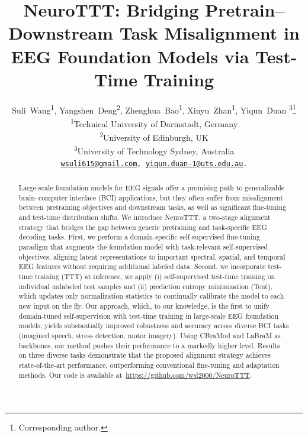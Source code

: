\documentclass{article} %
\title{NeuroTTT: Bridging Pretrain–Downstream Task Misalignment in EEG Foundation Models via Test-Time Training}
\author{Suli~Wang\textsuperscript{\rm 1}, 
Yangshen~Deng\textsuperscript{\rm 2}, 
Zhenghua~Bao\textsuperscript{\rm 1}, 
Xinyu~Zhan\textsuperscript{\rm 1}, 
Yiqun~Duan \textsuperscript{\rm 3}\thanks{Corresponding author.} \\
\textsuperscript{\rm 1}Technical University of Darmstadt, Germany\\
\textsuperscript{\rm 2}University of Edinburgh, UK\\
\textsuperscript{\rm 3}University of Technology Sydney, Australia\\
\texttt{\href{mailto:wsuli615@gmail.com}{wsuli615@gmail.com}, \href{mailto:yiqun.duan-1@uts.edu.au}{yiqun.duan-1@uts.edu.au}.} \\
}
\begin{document}
\maketitle

\begin{abstract}

Large-scale foundation models for EEG signals offer a promising path to generalizable brain–computer interface (BCI) applications, but they often suffer from misalignment between pretraining objectives and downstream tasks, as well as significant fine-tuning and test-time distribution shifts. We introduce NeuroTTT, a two-stage alignment strategy that bridges the gap between generic pretraining and task-specific EEG decoding tasks. First, we perform a domain-specific self-supervised fine-tuning paradigm that augments the foundation model with task-relevant self-supervised objectives, aligning latent representations to important spectral, spatial, and temporal EEG features without requiring additional labeled data. Second, we incorporate test-time training (TTT) at inference, we apply (i) self-supervised test-time training on individual unlabeled test samples and (ii) prediction entropy minimization (Tent), which updates only normalization statistics to continually calibrate the model to each new input on the fly. Our approach, which, to our knowledge, is the first to unify domain-tuned self-supervision with test-time training in large-scale EEG foundation models, yields substantially improved robustness and accuracy across diverse BCI tasks (imagined speech, stress detection, motor imagery). Using CBraMod and LaBraM as backbones, our method pushes their performance to a markedly higher level. Results on three diverse tasks demonstrate that the proposed alignment strategy achieves state-of-the-art performance, outperforming conventional fine-tuning and adaptation methods. Our code is available at~\url{https://github.com/wsl2000/NeuroTTT}.



\end{abstract}
\end{document}
